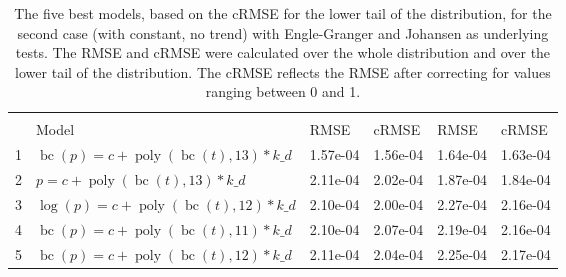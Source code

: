 \documentclass[12pt,a4paper]{article}
\DeclareMathOperator{\bc}{bc}
\DeclareMathOperator{\poly}{poly}
\begin{document}
\begin{table}[!h]

\caption{\label{tab:5_best_e_j_2}\label{tab:best_e_j_2} The five best models, based on the cRMSE for the lower tail of the distribution, for the second case (with constant, no trend) with Engle-Granger and Johansen as underlying tests. The RMSE and cRMSE were calculated over the whole distribution and over the lower tail of the distribution. The cRMSE reflects the RMSE after correcting for values ranging between 0 and 1.}
\centering
\fontsize{10}{12}\selectfont
\begin{tabular}[t]{ll>{\raggedleft\arraybackslash}p{2cm}>{\raggedleft\arraybackslash}p{2cm}>{\raggedleft\arraybackslash}p{2cm}>{\raggedleft\arraybackslash}p{2cm}}
\toprule
\multicolumn{1}{c}{\textbf{}} & \multicolumn{1}{c}{\textbf{}} & \multicolumn{2}{c}{\textbf{Full Distribution}} & \multicolumn{2}{c}{\textbf{Lower Tail ($p \leq 0.2$)}} \\
\cmidrule(l{3pt}r{3pt}){3-4} \cmidrule(l{3pt}r{3pt}){5-6}
  & Model & RMSE & cRMSE & RMSE & cRMSE\\
\midrule
\rowcolor{gray!6}  1 & $\bc(p) = c + \poly\left( \bc(t), 13 \right) * k\_d$ & 1.57e-04 & 1.56e-04 & 1.64e-04 & 1.63e-04\\
2 & $p = c + \poly\left( \bc(t), 13 \right) * k\_d$ & 2.11e-04 & 2.02e-04 & 1.87e-04 & 1.84e-04\\
\rowcolor{gray!6}  3 & $\log(p) = c + \poly\left( \bc(t), 12 \right) * k\_d$ & 2.10e-04 & 2.00e-04 & 2.27e-04 & 2.16e-04\\
4 & $\bc(p) = c + \poly\left( \bc(t), 11 \right) * k\_d$ & 2.10e-04 & 2.07e-04 & 2.19e-04 & 2.16e-04\\
\rowcolor{gray!6}  5 & $\bc(p) = c + \poly\left( \bc(t), 12 \right) * k\_d$ & 2.11e-04 & 2.04e-04 & 2.25e-04 & 2.17e-04\\
\bottomrule
\end{tabular}
\end{table}
\end{document}

